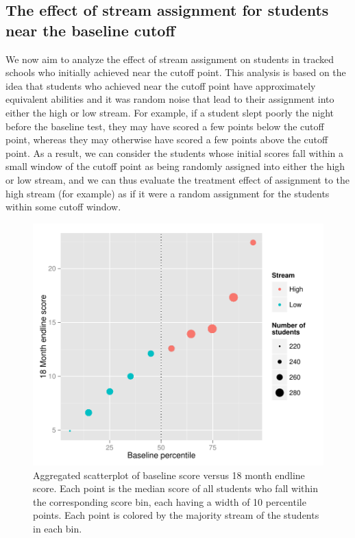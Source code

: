 \documentclass[11pt]{article}
\begin{document}
 \subsection{The effect of stream assignment for students near the baseline cutoff}
We now aim to analyze the effect of stream assignment on students in tracked schools who initially achieved near the cutoff point. This analysis is based on the idea that students who achieved near the cutoff point have approximately equivalent abilities and it was random noise that lead to their assignment into either the high or low stream. For example, if a student slept poorly the night before the baseline test, they may have scored a few points below the cutoff point, whereas they may otherwise have scored a few points above the cutoff point. As a result, we can consider the students whose initial scores fall within a small window of the cutoff point as being randomly assigned into either the high or low stream, and we can thus evaluate the treatment effect of assignment to the high stream (for example) as if it were a random assignment for the students within some cutoff window.\\
  \begin{figure}[H]
 \centering
 \includegraphics[scale=0.7]{RD_initial.pdf}
 \caption{Aggregated scatterplot of baseline score versus 18 month endline score. Each point is the median score of all students who fall within the corresponding score bin, each having a width of 10 percentile points. Each point is colored by the majority stream of the students in each bin.}
 \label{fig:RD_big}
 \end{figure}
\end{document}

